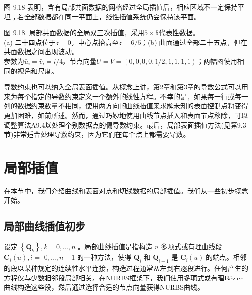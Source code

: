 \documentclass[../main.tex]{subfiles}
\begin{document}
图 9.18 表明，含有局部共面数据的网格经过全局插值后，相应区域不一定保持平坦；若全部数据都在同一平面上，线性插值系统仍会保持该平面。

\begin{center}
\begin{minipage}{37cm}
\vspace*{.6\baselineskip}
\centering
{}
\par\smallskip
图 9.18. 局部共面数据的全局双三次插值，采用$5\times5$代表性数据。\\
(a) 二十四点位于$z=0$，中心点抬高至$z=6/5$；(b) 曲面通过全部二十五点，但在共面数据之间出现波动。\\
参数为$\bar u_i=\bar v_i=i/4$，节点向量$U=V=(0,0,0,0,1/2,1,1,1,1)$；两幅图使用相同的视角和尺度。
\end{minipage}
\end{center}







导数约束也可以纳入全局表面插值。从概念上讲，第2章和第3章的导数公式可以用来为每个指定的导数约束定义一个额外的线性方程。不幸的是，如果每一行或每一列的数据约束数量不相同，使用两方向的曲线插值来求解未知的表面控制点将变得更加困难，如前所述。然而，通过巧妙地使用曲线节点插入和表面节点移除，可以调整算法A9.4以处理个别数据点的偏导数约束。最后，局部表面插值方法(见第9.3节)非常适合处理导数约束，因为它们在每个点上都需要导数。



\section{局部插值}

在本节中，我们介绍曲线和表面对点和切线数据的局部插值。我们从一些初步概念开始。

\subsection{局部曲线插值初步}

设定 \(\left\{  {\mathbf{Q}}_{k}\right\}  ,k = 0,\ldots ,n\) 。局部曲线插值是指构造 \(n\) 多项式或有理曲线段 \({\mathbf{C}}_{i}\left( u\right) ,i =\)  \(0,\ldots ,n - 1\) 的一种方法，使得 \({\mathbf{Q}}_{i}\) 和 \({\mathbf{Q}}_{i + 1}\) 是 \({\mathbf{C}}_{i}\left( u\right)\) 的端点。相邻的段以某种规定的连续性水平连接，构造过程通常从左到右逐段进行。任何产生的方程仅与少数相邻段局部相关。在NURBS框架下，我们使用多项式或有理Bézier曲线构造这些段，然后通过选择合适的节点向量获得NURBS曲线。
\end{document}

